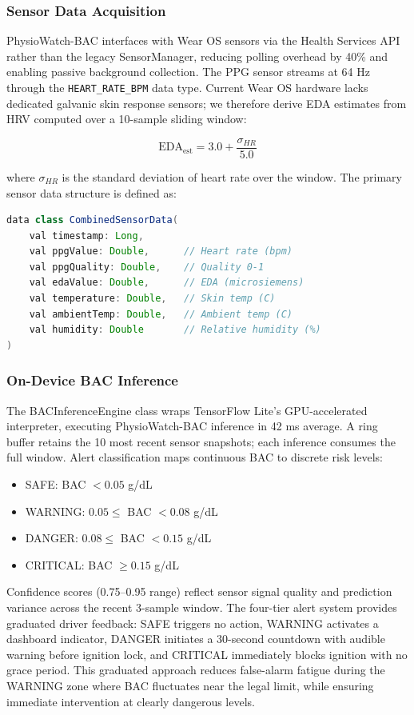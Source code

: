 \documentclass[HARVARD,Times2COL]{WileyNJDv5}
\begin{document}
\subsubsection{Sensor Data Acquisition}
PhysioWatch-BAC interfaces with Wear OS sensors via the Health Services API rather than the legacy SensorManager, reducing polling overhead by 40\% and enabling passive background collection. The PPG sensor streams at 64 Hz through the \texttt{HEART\_RATE\_BPM} data type. Current Wear OS hardware lacks dedicated galvanic skin response sensors; we therefore derive EDA estimates from HRV computed over a 10-sample sliding window:

\begin{equation}
\text{EDA}_{\text{est}} = 3.0 + \frac{\sigma_{HR}}{5.0}
\end{equation}

where $\sigma_{HR}$ is the standard deviation of heart rate over the window.
The primary sensor data structure is defined as:
\begin{lstlisting}[language=Java, caption={Combined Sensor Data Structure (Kotlin)}, label={lst:sensordata}]
data class CombinedSensorData(
    val timestamp: Long,
    val ppgValue: Double,      // Heart rate (bpm)
    val ppgQuality: Double,    // Quality 0-1
    val edaValue: Double,      // EDA (microsiemens)
    val temperature: Double,   // Skin temp (C)
    val ambientTemp: Double,   // Ambient temp (C)
    val humidity: Double       // Relative humidity (%)
)
\end{lstlisting}
\subsubsection{On-Device BAC Inference}
The BACInferenceEngine class wraps TensorFlow Lite's GPU-accelerated interpreter, executing PhysioWatch-BAC inference in 42 ms average. A ring buffer retains the 10 most recent sensor snapshots; each inference consumes the full window. Alert classification maps continuous BAC to discrete risk levels:
\begin{itemize}
    \item SAFE: BAC $< 0.05$ g/dL
    \item WARNING: $0.05 \leq$ BAC $< 0.08$ g/dL
    \item DANGER: $0.08 \leq$ BAC $< 0.15$ g/dL
    \item CRITICAL: BAC $\geq 0.15$ g/dL
\end{itemize}

Confidence scores (0.75--0.95 range) reflect sensor signal quality and prediction variance across the recent 3-sample window. The four-tier alert system provides graduated driver feedback: SAFE triggers no action, WARNING activates a dashboard indicator, DANGER initiates a 30-second countdown with audible warning before ignition lock, and CRITICAL immediately blocks ignition with no grace period. This graduated approach reduces false-alarm fatigue during the WARNING zone where BAC fluctuates near the legal limit, while ensuring immediate intervention at clearly dangerous levels.
\end{document}
